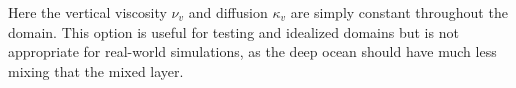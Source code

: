 Here the vertical viscosity $\nu_v$ and diffusion $\kappa_v$ are simply constant throughout the domain.  This option is useful for testing and idealized domains but is not appropriate for real-world simulations, as the deep ocean should have much less mixing that the mixed layer.
